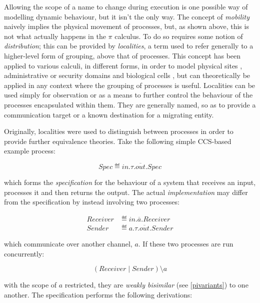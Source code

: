 Allowing the scope of a name to change during execution is one possible
way of modelling dynamic behaviour, but it isn't the only way.  The
concept of \emph{mobility} naively implies the physical movement of
processes, but, as shown above, this is not what actually happens in the
$\pi$ calculus.  To do so requires some notion of \emph{distribution};
this can be provided by \emph{localities}, a term used to refer
generally to a higher-level form of grouping, above that of processes.
This concept has been applied to various calculi, in different forms, in
order to model physical sites \cite{wojciechowski:phd}, administrative
or security domains \cite{amb,seal} and biological cells \cite{brane04},
but can theoretically be applied in any context where the grouping of
processes is useful.  Localities can be used simply for observation or
as a means to further control the behaviour of the processes
encapsulated within them.  They are generally named, so as to provide a
communication target or a known destination for a migrating entity.

Originally, localities were used to distinguish between processes in
order to provide further equivalence theories.  Take the following simple
CCS-based example process:

\begin{equation}
\label{lccsspec}
Spec \eqdef in.\tau.\overline{out}.Spec
\end{equation}

\noindent which forms the \emph{specification} for the behaviour of a
system that receives an input, processes it and then returns the output.
The actual \emph{implementation} may differ from the specification by
instead involving two processes:

\begin{align}
\label{lccs2proc}
Receiver & \eqdef in.\overline{a}.Receiver \\
Sender & \eqdef a.\tau.\overline{out}.Sender
\end{align}

\noindent which communicate over another channel, $a$.  If these two
processes are run concurrently:

\begin{equation}
(Receiver\;|\;Sender)\setminus a
\end{equation}

\noindent with the scope of $a$ restricted, they are \emph{weakly
bisimilar} (see \ref{pivariants}) to one another.  The specification
performs the following derivations:

